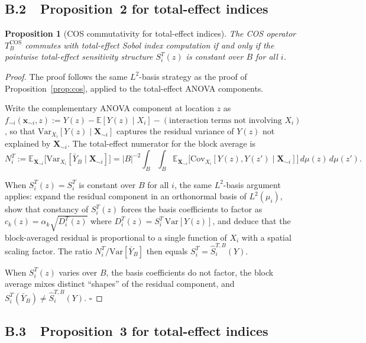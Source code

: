 \documentclass[11pt,onecolumn]{article}
\newtheorem{proposition}{Proposition}
\begin{document}
\subsection*{B.2\ \ Proposition~2 for total-effect indices}

\begin{proposition}[COS commutativity for total-effect indices]
\label{prop:cos_T}
The COS operator $T^{\mathrm{COS}}_B$ commutes with total-effect Sobol index
computation if and only if the pointwise total-effect sensitivity structure
$S_i^T(z)$ is constant over $B$ for all $i$.
\end{proposition}

\begin{proof}
The proof follows the same $L^2$-basis strategy as the proof of
Proposition~\ref{prop:cos}, applied to the total-effect ANOVA components.

Write the complementary ANOVA component at location $z$ as
$f_{\sim i}(\mathbf{x}_{\sim i}, z) := Y(z) - \mathbb{E}[Y(z)\mid X_i] - (\text{interaction terms not involving }X_i)$,
so that $\mathrm{Var}_{X_i}[Y(z)\mid \mathbf{X}_{\sim i}]$ captures the
residual variance of $Y(z)$ not explained by $\mathbf{X}_{\sim i}$.
The total-effect numerator for the block average is
\[
  N_i^T := \mathbb{E}_{\mathbf{X}_{\sim i}}\bigl[\mathrm{Var}_{X_i}[\bar{Y}_B \mid \mathbf{X}_{\sim i}]\bigr]
  = |B|^{-2}\int_B\int_B
    \mathbb{E}_{\mathbf{X}_{\sim i}}\bigl[\mathrm{Cov}_{X_i}[Y(z), Y(z') \mid \mathbf{X}_{\sim i}]\bigr]
    \,d\mu(z)\,d\mu(z').
\]

When $S_i^T(z) = S_i^T$ is constant over $B$ for all $i$, the same
$L^2$-basis argument applies: expand the residual component in an
orthonormal basis of $L^2(\mu_i)$, show that constancy of $S_i^T(z)$
forces the basis coefficients to factor as
$c_k(z) = \alpha_k\sqrt{D_i^T(z)}$ where $D_i^T(z) = S_i^T\,\mathrm{Var}[Y(z)]$,
and deduce that the block-averaged residual is proportional to a single
function of $X_i$ with a spatial scaling factor.  The ratio
$N_i^T / \mathrm{Var}[\bar{Y}_B]$ then equals $S_i^T = \hat{S}_i^{T,B}(Y)$.

When $S_i^T(z)$ varies over $B$, the basis coefficients do not factor,
the block average mixes distinct ``shapes'' of the residual component, and
$S_i^T(\bar{Y}_B) \neq \hat{S}_i^{T,B}(Y)$.  $\square$
\end{proof}

\subsection*{B.3\ \ Proposition~3 for total-effect indices}
\end{document}
